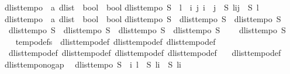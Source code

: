 \begin{isabellebody}
\isanewline
{}\isamarkupfalse%
\ dlist{\isacharunderscore}tempo{}\ {\isacharcolon}{\isacharcolon}\ {\isachardoublequoteopen}{\isacharparenleft}{\isacharprime}a\ dlist\ {\isasymRightarrow}\ bool{\isacharparenright}\ {\isasymRightarrow}\ bool{\isachardoublequoteclose}\isanewline
{}\isanewline
{\isachardoublequoteopen}dlist{\isacharunderscore}tempo{}\ S\ {\isasymequiv}\ {\isasymforall}l{\isachardot}\ {\isacharparenleft}{\isasymexists}\ i\ j{\isachardot}\ i\ {\isacharless}\ j\ {\isasymand}\ S\ {\isacharparenleft}l{\isasymdagger}i{\isachardot}{\isachardot}j{\isacharparenright}{\isacharparenright}\ {\isasymlongleftrightarrow}\ S\ l{\isachardoublequoteclose}\isanewline
\isanewline
{}\isamarkupfalse%
\ dlist{\isacharunderscore}tempo\ {\isacharcolon}{\isacharcolon}\ {\isachardoublequoteopen}{\isacharparenleft}{\isacharprime}a\ dlist\ {\isasymRightarrow}\ bool{\isacharparenright}\ {\isasymRightarrow}\ bool{\isachardoublequoteclose}\isanewline
{}\isanewline
{\isachardoublequoteopen}dlist{\isacharunderscore}tempo\ S\ {\isasymequiv}\ dlist{\isacharunderscore}tempo{}\ S\ {\isasymand}\ dlist{\isacharunderscore}tempo{}\ S\ {\isasymand}\ \isanewline
\ \ dlist{\isacharunderscore}tempo{}\ S\ {\isasymand}\ dlist{\isacharunderscore}tempo{}\ S\ {\isasymand}\ dlist{\isacharunderscore}tempo{}\ S\ {\isasymand}\ dlist{\isacharunderscore}tempo{}\ S\ {\isasymand}\ \isanewline
\ \ dlist{\isacharunderscore}tempo{}\ S{\isachardoublequoteclose}\isanewline
\ \ \isanewline
{}\isamarkupfalse%
\ tempo{\isacharunderscore}defs\ {\isacharequal}\ dlist{\isacharunderscore}tempo{\isacharunderscore}def\ dlist{\isacharunderscore}tempo{}{\isacharunderscore}def\ dlist{\isacharunderscore}tempo{}{\isacharunderscore}def\ \isanewline
\ \ dlist{\isacharunderscore}tempo{}{\isacharunderscore}def\ dlist{\isacharunderscore}tempo{}{\isacharunderscore}def\ dlist{\isacharunderscore}tempo{}{\isacharunderscore}def\ dlist{\isacharunderscore}tempo{}{\isacharunderscore}def\ \isanewline
\ \ dlist{\isacharunderscore}tempo{}{\isacharunderscore}def\isanewline
\isanewline
{}\isamarkupfalse%
\ dlist{\isacharunderscore}tempo{\isacharunderscore}{}{\isacharunderscore}no{\isacharunderscore}gap{\isacharcolon}\isanewline
\ \ {\isachardoublequoteopen}dlist{\isacharunderscore}tempo{}\ S\ {\isasymLongrightarrow}\ {\isasymforall}i\ l{\isachardot}\ {\isasymnot}\ {\isacharparenleft}{\isacharparenleft}S\ {\isacharparenleft}l{\isasymdagger}{\isachardot}{\isachardot}i{\isacharparenright}\ {\isasymand}\ S\ {\isacharparenleft}l{\isasymdagger}i{\isachardot}{\isachardot}{\isacharparenright}{\isacharparenright}{\isacharparenright}{\isachardoublequoteclose}\isanewline

\end{isabellebody}
